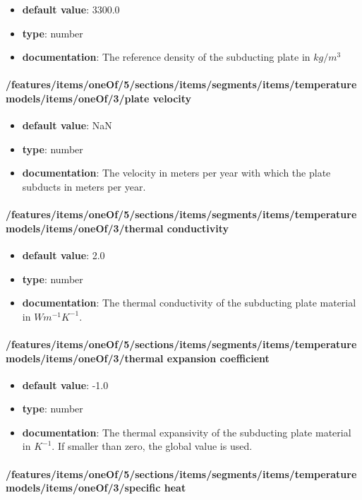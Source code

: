 \begin{itemize}\item {\bf default value}: 3300.0
\item {\bf type}: number
\item {\bf documentation}: The reference density of the subducting plate in $kg/m^3$
\end{itemize}\paragraph{/features/items/oneOf/5/sections/items/segments/items/temperature models/items/oneOf/3/plate velocity}
\begin{itemize}\item {\bf default value}: NaN
\item {\bf type}: number
\item {\bf documentation}: The velocity in meters per year with which the plate subducts in meters per year.
\end{itemize}\paragraph{/features/items/oneOf/5/sections/items/segments/items/temperature models/items/oneOf/3/thermal conductivity}
\begin{itemize}\item {\bf default value}: 2.0
\item {\bf type}: number
\item {\bf documentation}: The thermal conductivity of the subducting plate material in $W m^{-1} K^{-1}$.
\end{itemize}\paragraph{/features/items/oneOf/5/sections/items/segments/items/temperature models/items/oneOf/3/thermal expansion coefficient}
\begin{itemize}\item {\bf default value}: -1.0
\item {\bf type}: number
\item {\bf documentation}: The thermal expansivity of the subducting plate material in $K^{-1}$. If smaller than zero, the global value is used.
\end{itemize}\paragraph{/features/items/oneOf/5/sections/items/segments/items/temperature models/items/oneOf/3/specific heat}
